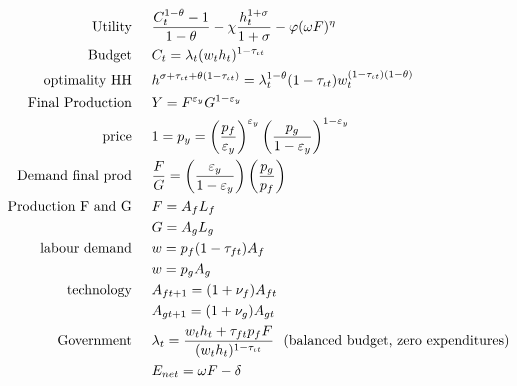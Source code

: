 \begin{align}
\text{Utility}\hspace{5mm}& \frac{C_t^{1-\theta}-1}{1-\theta}-\chi \frac{h_t^{1+\sigma}}{1+\sigma}-\varphi(\omega F)^\eta\\
\text{Budget}\hspace{5mm}& C_t = \lambda_t(w_th_t)^{1-\tau_{\iota t}}\\
\text{optimality HH}\hspace{5mm}& h^{\sigma+\tau_{\iota t}+\theta(1-\tau_{\iota t})}=\lambda_t^{1-\theta}(1-\tau_{\iota t})w_t^{(1-\tau_{\iota t})(1-\theta)}\\
\text{Final Production}\hspace{5mm}&Y=F^{\varepsilon_y}G^{1-
\varepsilon_y}\\ %
\text{price}\hspace{5mm}&1=p_y= \left(\frac{p_f}{\varepsilon_y}\right)^{\varepsilon_y}\left(\frac{p_g}{1-\varepsilon_y}\right)^{1-\varepsilon_y}\\
\text{Demand final prod}\hspace{5mm}&\frac{F}{G}=\left(\frac{\varepsilon_y}{1-\varepsilon_y}\right)\left(\frac{p_g}{p_f}\right)\\
\text{Production F and G}\hspace{5mm}&F=A_fL_f\\\
& G=A_gL_g\\
\text{labour demand}\hspace{5mm}& w=p_f(1-\tau_{ft})A_f\\
& w=p_gA_g\\
\text{technology}\hspace{5mm}&A_{ft+1}=(1+\nu_f)A_{ft}\\
&A_{gt+1}=(1+\nu_g)A_{gt}\\
\text{Government}\hspace{5mm}&\lambda_t=\frac{w_t h_t+\tau_{ft}p_fF}{(w_t h_t)^{1-\tau_{\iota t}}}\ \ \text{(balanced budget, zero expenditures)}\\
&E_{net}=\omega F-\delta
\end{align}

